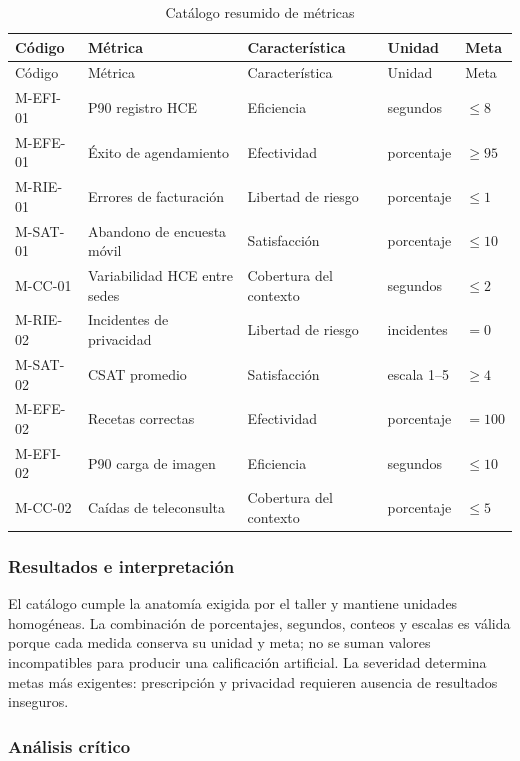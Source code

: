 \begin{longtable}{p{1.6cm}p{3.7cm}p{2.6cm}p{1.9cm}p{2.0cm}}
\caption{Catálogo resumido de métricas}\label{tab:catalog}\\
\toprule
Código & Métrica & Característica & Unidad & Meta \\
\midrule
\endfirsthead
\toprule
Código & Métrica & Característica & Unidad & Meta \\
\midrule
\endhead
M-EFI-01 & P90 registro HCE & Eficiencia & segundos & $\leq 8$ \\
M-EFE-01 & Éxito de agendamiento & Efectividad & porcentaje & $\geq 95$ \\
M-RIE-01 & Errores de facturación & Libertad de riesgo & porcentaje & $\leq1$ \\
M-SAT-01 & Abandono de encuesta móvil & Satisfacción & porcentaje & $\leq10$ \\
M-CC-01 & Variabilidad HCE entre sedes & Cobertura del contexto & segundos & $\leq 2$ \\
M-RIE-02 & Incidentes de privacidad & Libertad de riesgo & incidentes & $=0$ \\
M-SAT-02 & CSAT promedio & Satisfacción & escala 1--5 & $\geq 4$ \\
M-EFE-02 & Recetas correctas & Efectividad & porcentaje & $=100$ \\
M-EFI-02 & P90 carga de imagen & Eficiencia & segundos & $\leq 10$ \\
M-CC-02 & Caídas de teleconsulta & Cobertura del contexto & porcentaje & $\leq5$ \\
\bottomrule
\end{longtable}

\subsubsection{Resultados e interpretación}

El catálogo cumple la anatomía exigida por el taller y mantiene unidades homogéneas. La combinación de porcentajes, segundos, conteos y escalas es válida porque cada medida conserva su unidad y meta; no se suman valores incompatibles para producir una calificación artificial. La severidad determina metas más exigentes: prescripción y privacidad requieren ausencia de resultados inseguros.

\subsubsection{Análisis crítico}

